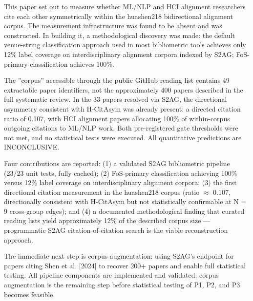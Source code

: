 
This paper set out to measure whether ML/NLP and HCI alignment researchers cite each other symmetrically within the huashen218 bidirectional alignment corpus. The measurement infrastructure was found to be absent and was constructed. In building it, a methodological discovery was made: the default venue-string classification approach used in most bibliometric tools achieves only 12\% label coverage on interdisciplinary alignment corpora indexed by S2AG; FoS-primary classification achieves 100\%.

The ''corpus'' accessible through the public GitHub reading list contains 49 extractable paper identifiers, not the approximately 400 papers described in the full systematic review. In the 33 papers resolved via S2AG, the directional asymmetry consistent with H-CitAsym was already present: a directed citation ratio of 0.107, with HCI alignment papers allocating 100\% of within-corpus outgoing citations to ML/NLP work. Both pre-registered gate thresholds were not met, and no statistical tests were executed. All quantitative predictions are INCONCLUSIVE.

Four contributions are reported: (1) a validated S2AG bibliometric pipeline (23/23 unit tests, fully cached); (2) FoS-primary classification achieving 100\% versus 12\% label coverage on interdisciplinary alignment corpora; (3) the first directional citation measurement in the huashen218 corpus (ratio $\approx$ 0.107, directionally consistent with H-CitAsym but not statistically confirmable at N = 9 cross-group edges); and (4) a documented methodological finding that curated reading lists yield approximately 12\% of the described corpus size --- programmatic S2AG citation-of-citation search is the viable reconstruction approach.

The immediate next step is corpus augmentation: using S2AG's endpoint for papers citing Shen et al. [2024] to recover 200+ papers and enable full statistical testing. All pipeline components are implemented and validated; corpus augmentation is the remaining step before statistical testing of P1, P2, and P3 becomes feasible.

